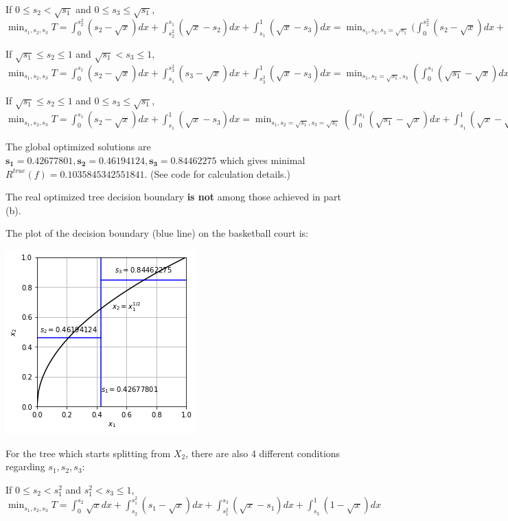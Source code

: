 \documentclass[paper=letter, fontsize=12pt]{article}
\begin{document}
\begin{enumerate}[label=(\alph*)]
	If $0 \leq s_2 < \sqrt{s_1}$ and $0 \leq s_3 \leq \sqrt{s_1}$, $\min_{s_1, s_2, s_3} T = \int_{0}^{s_2^2} (s_2 - \sqrt{x}) dx + \int_{s_2^2}^{s_1} (\sqrt{x} - s_2) dx + \int_{s_1}^{1} (\sqrt{x} - s_3) dx = \min_{s_1, s_2, s_3 = \sqrt{s_1}} (\int_{0}^{s_2^2} (s_2 - \sqrt{x}) dx + \int_{s_2^2}^{s_1} (\sqrt{x} - s_2) dx + \int_{s_1}^{1} (\sqrt{x} - \sqrt{s_1} dx)$
	
	If $\sqrt{s_1} \leq s_2 \leq 1$ and $\sqrt{s_1} < s_3 \leq 1$, $\min_{s_1, s_2, s_3} T = \int_{0}^{s_1} (s_2 - \sqrt{x}) dx + \int_{s_1}^{s_3^2} (s_3 - \sqrt{x}) dx + \int_{s_3^2}^{1} (\sqrt{x} - s_3) dx = \min_{s_1, s_2 = \sqrt{s_1}, s_3} (\int_{0}^{s_1} (\sqrt{s_1} - \sqrt{x}) dx + \int_{s_1}^{s_3^2} (s_3 - \sqrt{x}) dx + \int_{s_3^2}^{1} (\sqrt{x} - s_3) dx)$
	
	If $\sqrt{s_1} \leq s_2 \leq 1$ and $0 \leq s_3 \leq \sqrt{s_1}$, $\min_{s_1, s_2, s_3} T = \int_{0}^{s_1} (s_2 - \sqrt{x}) dx + \int_{s_1}^{1} (\sqrt{x} - s_3) dx = \min_{s_1, s_2 = \sqrt{s_1}, s_3 = \sqrt{s_1}} (\int_{0}^{s_1} (\sqrt{s_1} - \sqrt{x}) dx + \int_{s_1}^{1} (\sqrt{x} - \sqrt{s_1}) dx)$
	
	The global optimized solutions are $\mathbf{s_1 = 0.42677801, s_2 = 0.46194124, s_3 = 0.84462275}$ which gives minimal  $R^{true}(f) = \mathbf{0.1035845342551841}$. (See code for calculation details.)
	
	The real optimized tree decision boundary \textbf{is not} among those achieved in part (b).
	
	The plot of the decision boundary (blue line) on the basketball court is:
	
	\includegraphics[scale=0.6]{q1d1.png}
	
	For the tree which starts splitting from $X_2$, there are also 4 different conditions regarding $s_1, s_2, s_3$:
	
	If $0 \leq s_2 < s_1^2$ and $s_1^2 < s_3 \leq 1$, $\min_{s_1, s_2, s_3} T = \int_{0}^{s_2} \sqrt{x} dx + \int_{s_2}^{s_1^2} (s_1 - \sqrt{x}) dx + \int_{s_1^2}^{s_3} (\sqrt{x} - s_1) dx + \int_{s_3}^{1} (1 - \sqrt{x}) dx$
	

\end{enumerate}
\end{document}
